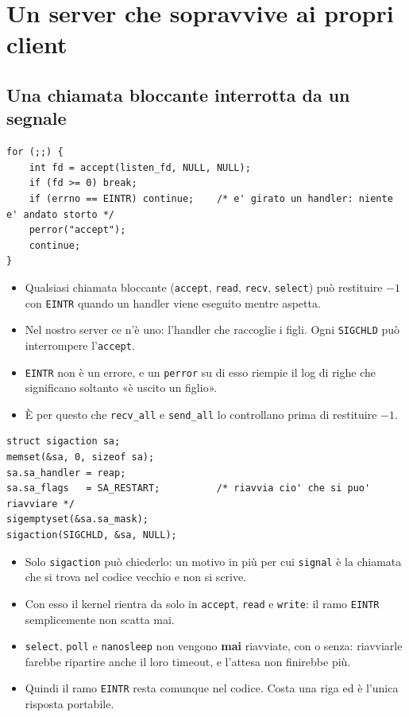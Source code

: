 \section{Un server che sopravvive ai propri client}

\subsection{Una chiamata bloccante interrotta da un segnale}

\begin{lstlisting}[language={[POSIX]C}, style=wnumbers, title={EINTR non è un errore}]
for (;;) {
    int fd = accept(listen_fd, NULL, NULL);
    if (fd >= 0) break;
    if (errno == EINTR) continue;    /* e' girato un handler: niente e' andato storto */
    perror("accept");
    continue;
}
\end{lstlisting}

\begin{itemize}
    \item Qualsiasi chiamata bloccante (\texttt{accept}, \texttt{read}, \texttt{recv}, \texttt{select}) può restituire
          $-1$ con \texttt{EINTR} quando un handler viene eseguito mentre aspetta.
    \item Nel nostro server ce n'è uno: l'handler che raccoglie i figli. Ogni \texttt{SIGCHLD} può interrompere
          l'\texttt{accept}.
    \item \texttt{EINTR} non è un errore, e un \texttt{perror} su di esso riempie il log di righe che significano soltanto
          «è uscito un figlio».
    \item È per questo che \texttt{recv\_all} e \texttt{send\_all} lo controllano prima di restituire $-1$.
\end{itemize}

\begin{lstlisting}[language={[POSIX]C}, style=wnumbers, title={SA\_RESTART}]
struct sigaction sa;
memset(&sa, 0, sizeof sa);
sa.sa_handler = reap;
sa.sa_flags   = SA_RESTART;          /* riavvia cio' che si puo' riavviare */
sigemptyset(&sa.sa_mask);
sigaction(SIGCHLD, &sa, NULL);
\end{lstlisting}

\begin{itemize}
    \item Solo \texttt{sigaction} può chiederlo: un motivo in più per cui \texttt{signal} è la chiamata che si trova nel
          codice vecchio e non si scrive.
    \item Con esso il kernel rientra da solo in \texttt{accept}, \texttt{read} e \texttt{write}: il ramo \texttt{EINTR}
          semplicemente non scatta mai.
    \item \texttt{select}, \texttt{poll} e \texttt{nanosleep} non vengono \textbf{mai} riavviate, con o senza: riavviarle
          farebbe ripartire anche il loro timeout, e l'attesa non finirebbe più.
    \item Quindi il ramo \texttt{EINTR} resta comunque nel codice. Costa una riga ed è l'unica risposta portabile.
\end{itemize}

